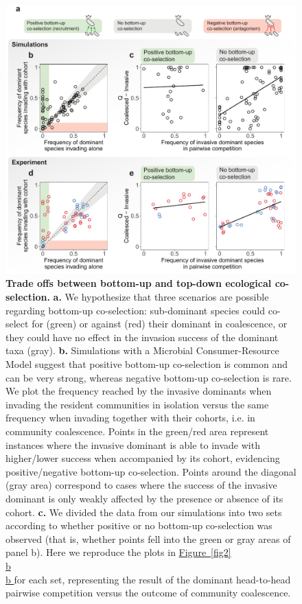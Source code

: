 \documentclass[a4paper,10pt]{article}
\newcommand{\figref}[2][]{%
  \hyperref[{#2}]{%
    Figure~\ref*{#2}%
    \ifx\\#1\\%
    \else
      #1%
    \fi
  }%
}
\begin{document}
\begin{figure}[!h]
\centering
\internallinenumbers
\includegraphics[width=12cm,keepaspectratio]{figs/fig3.pdf}
\caption{\textbf{Trade offs between bottom-up and top-down ecological co-selection.}
\textbf{a.} We hypothesize that three scenarios are possible regarding bottom-up co-selection:
sub-dominant species could co-select for (green) or against (red) their dominant in coalescence,
or they could have no effect in the invasion success of the dominant taxa (gray).
\textbf{b.} Simulations with a Microbial Consumer-Resource Model suggest that positive bottom-up
co-selection is common and can be very strong, whereas negative bottom-up co-selection is rare.
We plot the frequency reached by the invasive dominants when invading the resident communities
in isolation versus the same frequency when invading together with their cohorts,
i.e. in community coalescence.
Points in the green/red area represent instances where the invasive dominant is able to invade
with higher/lower success when accompanied by its cohort, evidencing positive/negative
bottom-up co-selection.
Points around the diagonal (gray area) correspond to cases where the success of the invasive dominant
is only weakly affected by the presence or absence of its cohort.
\textbf{c.} We divided the data from our simulations into two sets according to whether
positive or no bottom-up co-selection was observed (that is, whether points fell into the green or gray
areas of panel b). Here we reproduce the plots in \figref[b]{fig2} for each set, representing the
result of the dominant head-to-head pairwise competition versus the outcome of community coalescence.
}
\end{figure}
\end{document}
